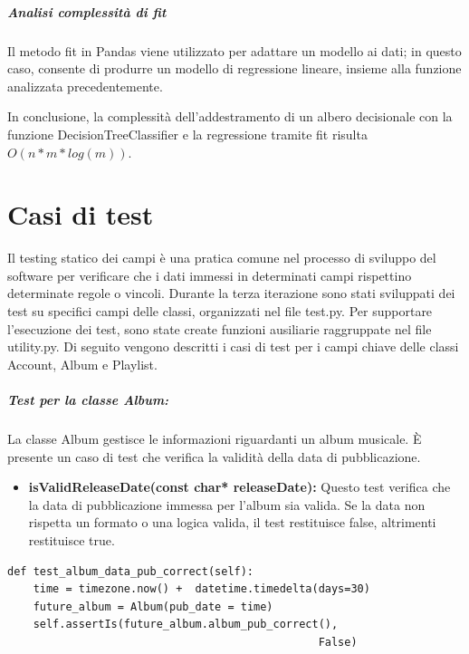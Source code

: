 \vspace{0.3cm}
\subparagraph{Analisi complessità di \textit{fit}}
Il metodo fit in Pandas viene utilizzato per adattare un modello ai dati; in questo caso,
consente di produrre un modello di regressione lineare, insieme alla funzione analizzata
precedentemente. 
\vspace{0.5cm}


In conclusione, la complessità dell'addestramento di un albero decisionale 
con la funzione DecisionTreeClassifier e la regressione tramite fit 
risulta $O(n * m * log(m))$.

\newpage
\section{Casi di test}
Il testing statico dei campi è una pratica comune nel processo di sviluppo del software 
per verificare che i dati immessi in determinati campi rispettino determinate regole o vincoli. 
Durante la terza iterazione sono stati sviluppati dei test su specifici campi delle classi, organizzati nel file test.py. Per supportare l'esecuzione 
dei test, sono state create funzioni ausiliarie raggruppate nel file utility.py.
Di seguito vengono descritti i casi di test per i campi chiave delle classi Account, Album e Playlist.


\subparagraph{Test per la classe \textbf{Album:}} La classe Album gestisce le informazioni riguardanti un album musicale. È presente un caso di test che verifica la validità della data di pubblicazione.
\begin{itemize}
    \item \textbf{isValidReleaseDate(const char* releaseDate):}
    Questo test verifica che la data di pubblicazione immessa per l'album sia valida. Se la data non rispetta un formato o una logica valida, il test restituisce false, altrimenti restituisce true.
\end{itemize}

\begin{lstlisting}[caption={class AlbumModelTests(TestCase)}, captionpos=b]
def test_album_data_pub_correct(self):
    time = timezone.now() +  datetime.timedelta(days=30)
    future_album = Album(pub_date = time)
    self.assertIs(future_album.album_pub_correct(), 
                                                False)
\end{lstlisting} 


